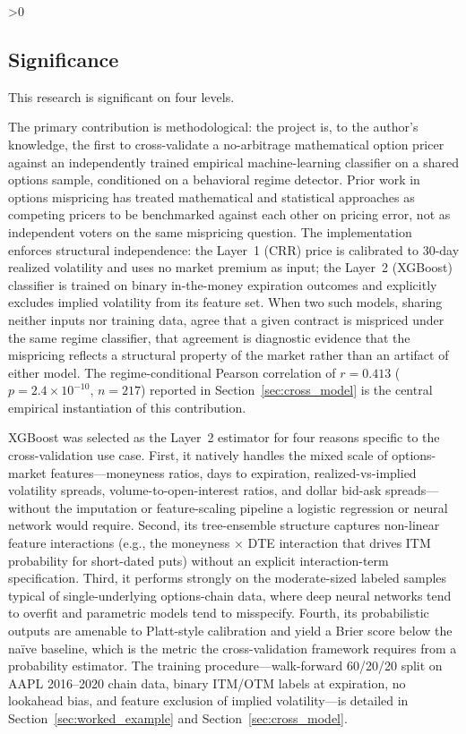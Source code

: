 \documentclass[12pt, letterpaper]{article}
\let\oldsubsection\subsection
\renewcommand{\subsection}{%
  \ifnum\value{subsection}>0 \clearpage\fi
  \oldsubsection
}
\begin{document}
\subsection{Significance}

This research is significant on four levels.

The primary contribution is methodological: the project is, to the
author's knowledge, the first to cross-validate a no-arbitrage
mathematical option pricer against an independently trained empirical
machine-learning classifier on a shared options sample, conditioned on
a behavioral regime detector. Prior work in options mispricing has
treated mathematical and statistical approaches as competing pricers
to be benchmarked against each other on pricing error, not as
independent voters on the same mispricing question. The
implementation enforces structural independence: the Layer~1 (CRR)
price is calibrated to 30-day realized volatility and uses no market
premium as input; the Layer~2 (XGBoost) classifier is trained on
binary in-the-money expiration outcomes and explicitly excludes
implied volatility from its feature set. When two such models, sharing
neither inputs nor training data, agree that a given contract is
mispriced under the same regime classifier, that agreement is
diagnostic evidence that the mispricing reflects a structural property
of the market rather than an artifact of either model. The
regime-conditional Pearson correlation of $r = 0.413$
($p = 2.4 \times 10^{-10}$, $n = 217$) reported in
Section~\ref{sec:cross_model} is the central empirical instantiation
of this contribution.

XGBoost \citep{Chen2016} was selected as the Layer~2 estimator for
four reasons specific to the cross-validation use case. First, it
natively handles the mixed scale of options-market features---moneyness
ratios, days to expiration, realized-vs-implied volatility spreads,
volume-to-open-interest ratios, and dollar bid-ask spreads---without
the imputation or feature-scaling pipeline a logistic regression or
neural network would require. Second, its tree-ensemble structure
captures non-linear feature interactions (e.g., the moneyness $\times$
DTE interaction that drives ITM probability for short-dated puts)
without an explicit interaction-term specification. Third, it
performs strongly on the moderate-sized labeled samples typical of
single-underlying options-chain data, where deep neural networks tend
to overfit and parametric models tend to misspecify. Fourth, its
probabilistic outputs are amenable to Platt-style calibration and
yield a Brier score below the naïve baseline, which is the metric the
cross-validation framework requires from a probability estimator. The
training procedure---walk-forward 60/20/20 split on AAPL 2016--2020
chain data, binary ITM/OTM labels at expiration, no lookahead bias,
and feature exclusion of implied volatility---is detailed in
Section~\ref{sec:worked_example} and Section~\ref{sec:cross_model}.
\end{document}
